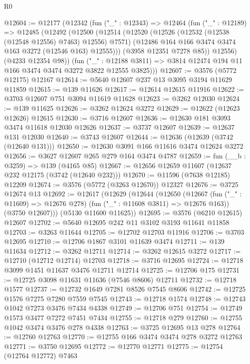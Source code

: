 \begin{lexlean}{R0}
\begin{coremodule}
@12604 := @12177
    (@12342
      (fun ("_" : @12343) =>
      @12464
        (fun ("_" : @12189) =>
        @12485
          (@12492
            (@12500
              (@12514
                (@12520
                  (@12526 (@12532 (@12538 (@12548 @12556) @7463) @12556) @7571)
                  (@12486 @164 @166 @3474 @3474 @163 @3272 (@12546 @163) @12555)))
              (@3958 @12351 @7278 @85))
            @12556)
          (@4233 @12354 @98))
        (fun ("_" : @12188 @3811) =>
        @3814 @12474 @194 @11 @166 @3474 @3474 @3272 @3822 @12555 @3825)))
@12607 := @3576 (@5772 @12175) @12167
@12614 := @5640 @12607 @237 @13 @3095 @3194 @11629 @11859
@12615 := @139 @11626
@12617 := @12614 @12615 @11916
@12622 := @3703 @12607 @751 @3094 @11619 @11628
@12623 := @3262 @12030
@12624 := @139 @11625
@12626 := @3262 @12624 @3272
@12629 := @12622 (@12623 @12626) @12615
@12630 := @3716 @12607
@12636 := @12630 @181 @3093 @3474 @11618 @12030 @12626
@12637 := @3737 @12607
@12639 := @12637 @131 @12030
@12640 := @3743 @12607
@12644 := @12636 (@12639 (@3742 (@12640 @131)))
@12650 := @12630 @3091 @166 @11616 @3474 @12624 @3272
@12656 := @3627 @12607 @265 @279 @164 @3474 @4787
@12659 := fun (__b : @3259) => @139 (@4165 @85)
@12667 := @12656 @12659 @11607 (@12637 @232 @12175 (@3742 (@12640 @232)))
@12670 := @11596 (@7638 @12185) @12209
@12674 := @3576 (@5772 (@3263 @12670)) @12327
@12676 := @3725 @12674 @13
@12692 := @12617
    (@12629
      (@12644
        (@12650
          (@12667 (fun ("_" : @11609) => @12676 @278) (fun ("_" : @11608 @3811) => @12676 @163))
          (@3750 @12607)))
      (@5130 @11600 @11625))
@12695 := @3576 (@6210 @12615) @12607
@12702 := @5640 @12695 @242 @11 @3102 @3193 @11641 @11858
@12703 := @3263 @11644
@12705 := @12702 @12703 @11916
@12706 := @3703 @12695
@12710 := @12706 @1867 @3101 @11639 @3474
@12711 := @139 @11634
@12712 := @3262 @12711
@12714 := @3262 @12615 @3272
@12717 := @12710 (@12712 @12714) @12703
@12718 := @3716 @12695
@12724 := @12718 @3099 @1451 @11637 @3476 @12711 @12714
@12725 := @12706 @175
@12731 := @12725 @3098 @11631 @11636 (@7546 @8606) @12711
@12732 := @12718 @1577
@12737 := @12732 @1649 @7281 @8526 @7545 @8606
@12742 := @12725 @1576 @7275 @7280 @7559 @7545
@12743 := @12718 @1574
@12748 := @12743 @1042 @7273 @3476 @7434 @4338
@12749 := @12706 @751
@12754 := @12749 @1573 @3477 @7272 @7451 @7434
@12755 := @12718 @279
@12760 := @12755 @1042 @3474 @3476 @278 @4338
@12763 := @3725 @12695 @13 @278
@12764 := @12760 @12763
@12770 := @12755 @166 @3474 @3474 @278 @3272 @12763
@12771 := @3750 @12695
@12772 := @12770 @12771
@12775 := @12754 (@12764 @12772) @7463

\end{coremodule}
\end{lexlean}
